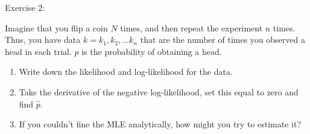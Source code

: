 \documentclass[12pt,xcolor=svgnames]{beamer}
\newcommand{\bl}{\color{blue}}
\newcommand{\nochap}{\vspace{0.5cm}}
\begin{document}
\begin{frame}
\nochap

{\bl Exercise 2:}\\

{\footnotesize
Imagine that you flip a coin $N$ times, and then repeat the experiment $n$ times. Thus, you have data $k=k_1, k_2, \dots k_n$ that are the number of times you observed a head in each trial. $p$ is the probability of obtaining a head. 
\begin{enumerate}
\item Write down the likelihood and log-likelihood for the data.
\item Take the derivative of the negative log-likelihood, set this equal to zero and find $\hat{p}$. 
\item If you couldn't fine the MLE analytically, how might you try to estimate it?
\end{enumerate}
}
\end{frame}

\fi
\end{document}
